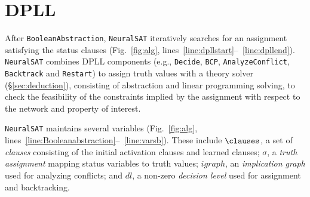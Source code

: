 \documentclass[oneside,11pt,dvipsnames]{book}
\numberwithin{equation}{section}
\theoremstyle{definition}
\theoremstyle{remark}
\newcommand{\tvn}[1]{\iftoggle{usecomment}{{\color{red}{[TVN]: #1}}}{}}
\newcommand{\hd}[1]{\iftoggle{usecomment}{{\color{blue}{[HD]: #1}}}{}}
\newcommand{\tool}{\texttt{NeuralSAT}}
\begin{document}



\section{DPLL}\label{sec:dpll}

After \texttt{BooleanAbstraction}, \tool{} iteratively searches for an assignment satisfying the status clauses (Fig.~\ref{fig:alg}, lines~\ref{line:dpllstart}--~\ref{line:dpllend}).
\tool{} combines  DPLL components (e.g., \texttt{Decide}, \texttt{BCP}, \texttt{AnalyzeConflict}, \texttt{Backtrack} and \texttt{Restart}) to assign truth values with a theory solver (\S\ref{sec:deduction}), consisting of abstraction and linear programming solving, to check the feasibility of the constraints implied by the assignment with respect to the network and property of interest.

\tool{} maintains several variables (Fig.~\ref{fig:alg}, lines~\ref{line:Booleanabstraction}--~\ref{line:varsb}). These include $\clauses$, a set of \emph{clauses} consisting of the initial activation clauses and learned clauses;   $\sigma$, a \emph{truth assignment} mapping status variables to truth values; $igraph$, an \emph{implication graph} used for analyzing conflicts; and  $dl$, a non-zero \emph{decision level} used for assignment and backtracking.



\end{document}
